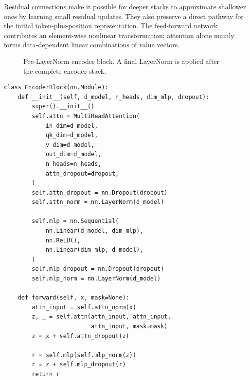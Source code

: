 \documentclass[11pt]{article}
\begin{document}
Residual connections make it possible for deeper stacks to approximate shallower ones by learning small residual updates. They also preserve a direct pathway for the initial token-plus-position representation. The feed-forward network contributes an element-wise nonlinear transformation; attention alone mainly forms data-dependent linear combinations of value vectors.

\begin{figure}[htbp]
\centering
{}
\caption{Pre-LayerNorm encoder block. A final LayerNorm is applied after the complete encoder stack.}
\label{fig:encoder_block}
\end{figure}

\begin{lstlisting}[caption={Pre-LayerNorm encoder block.},label={lst:encoder}]
class EncoderBlock(nn.Module):
    def __init__(self, d_model, n_heads, dim_mlp, dropout):
        super().__init__()
        self.attn = MultiHeadAttention(
            in_dim=d_model,
            qk_dim=d_model,
            v_dim=d_model,
            out_dim=d_model,
            n_heads=n_heads,
            attn_dropout=dropout,
        )
        self.attn_dropout = nn.Dropout(dropout)
        self.attn_norm = nn.LayerNorm(d_model)

        self.mlp = nn.Sequential(
            nn.Linear(d_model, dim_mlp),
            nn.ReLU(),
            nn.Linear(dim_mlp, d_model),
        )
        self.mlp_dropout = nn.Dropout(dropout)
        self.mlp_norm = nn.LayerNorm(d_model)

    def forward(self, x, mask=None):
        attn_input = self.attn_norm(x)
        z, _ = self.attn(attn_input, attn_input,
                         attn_input, mask=mask)
        z = x + self.attn_dropout(z)

        r = self.mlp(self.mlp_norm(z))
        r = z + self.mlp_dropout(r)
        return r
\end{lstlisting}
\end{document}
